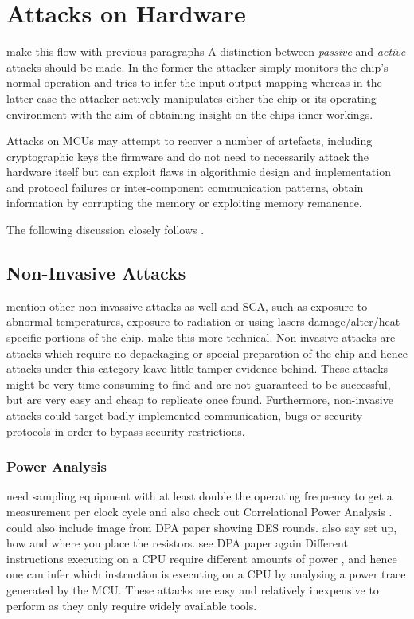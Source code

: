 \section{Attacks on Hardware}
{\color{red} make this flow with previous paragraphs}
\label{sec:curr_attacks}
A distinction between \emph{passive} and \emph{active} attacks should be made. In the former the attacker simply monitors the chip's normal operation and tries to infer the input-output mapping whereas in the latter case the attacker actively manipulates either the chip or its operating environment with the aim of obtaining insight on the chips inner workings. 

Attacks on MCUs may attempt to recover a number of artefacts, including cryptographic keys the firmware and do not need to necessarily attack the hardware itself but can exploit flaws in algorithmic design and implementation and protocol failures or inter-component communication patterns\citep{anderson:cautionary_note}\citep{kocher:DPA}, obtain information by corrupting the memory or exploiting memory remanence\citep{sergei:thesis}\citep{gutman:memory_remanence}.

The following discussion closely follows \citep{sergei:thesis}.

	\subsection{Non-Invasive Attacks}
	{\color{red} mention other non-invassive attacks as well and SCA, such as exposure to abnormal temperatures, exposure to radiation or using lasers damage/alter/heat specific portions of the chip. make this more technical. \citep{website:riscure}}
	Non-invasive attacks are attacks which require no depackaging or special preparation of the chip and hence attacks under this category leave little tamper evidence behind. These attacks might be very time consuming to find and are not guaranteed to be successful, but are very easy and cheap to replicate once found. Furthermore, non-invasive attacks could target badly implemented communication, bugs or security protocols in order to bypass security restrictions.
	
	\subsubsection{Power Analysis}
	{\color{red} need sampling equipment with at least double the operating frequency to get a measurement per clock cycle  and also check out Correlational Power Analysis \citep{DPA}\citep{website:riscure}  . could also include image from DPA paper showing DES rounds. also say set up, how and where you place the resistors. see DPA paper again}
	\label{subsubsec:power_analysis}
	Different instructions executing on a CPU require different amounts of power {\color{also because of CMOS nature 0 takes less power than 1}}, and hence one can infer which instruction is executing on a CPU by analysing a power trace generated by the MCU. These attacks are easy and relatively inexpensive to perform as they only require widely available tools.
	
